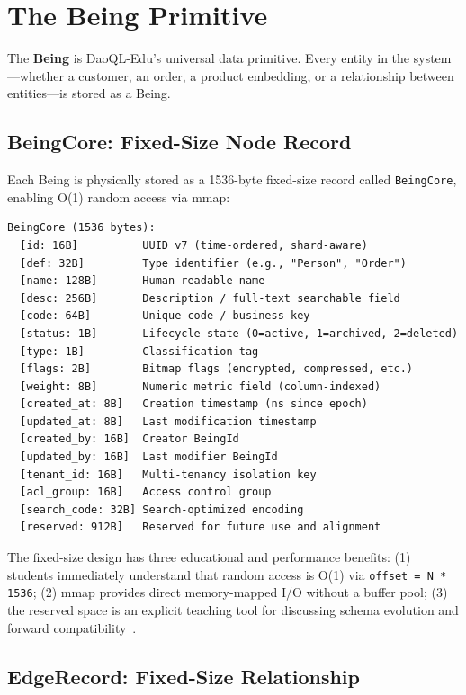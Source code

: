 \documentclass[11pt,a4paper]{article}
\begin{document}
\section{The Being Primitive}

The \textbf{Being} is DaoQL-Edu's universal data primitive. Every entity in
the system---whether a customer, an order, a product embedding, or a
relationship between entities---is stored as a Being.

\subsection{BeingCore: Fixed-Size Node Record}

Each Being is physically stored as a 1536-byte fixed-size record called
\texttt{BeingCore}, enabling O(1) random access via mmap:

\begin{verbatim}
BeingCore (1536 bytes):
  [id: 16B]          UUID v7 (time-ordered, shard-aware)
  [def: 32B]         Type identifier (e.g., "Person", "Order")
  [name: 128B]       Human-readable name
  [desc: 256B]       Description / full-text searchable field
  [code: 64B]        Unique code / business key
  [status: 1B]       Lifecycle state (0=active, 1=archived, 2=deleted)
  [type: 1B]         Classification tag
  [flags: 2B]        Bitmap flags (encrypted, compressed, etc.)
  [weight: 8B]       Numeric metric field (column-indexed)
  [created_at: 8B]   Creation timestamp (ns since epoch)
  [updated_at: 8B]   Last modification timestamp
  [created_by: 16B]  Creator BeingId
  [updated_by: 16B]  Last modifier BeingId
  [tenant_id: 16B]   Multi-tenancy isolation key
  [acl_group: 16B]   Access control group
  [search_code: 32B] Search-optimized encoding
  [reserved: 912B]   Reserved for future use and alignment
\end{verbatim}

The fixed-size design has three educational and performance benefits:
(1) students immediately understand that random access is O(1) via
\texttt{offset = N * 1536}; (2) mmap provides direct memory-mapped I/O
without a buffer pool; (3) the reserved space is an explicit teaching tool
for discussing schema evolution and forward compatibility~\cite{stonebraker2018}.

\subsection{EdgeRecord: Fixed-Size Relationship}
\end{document}
